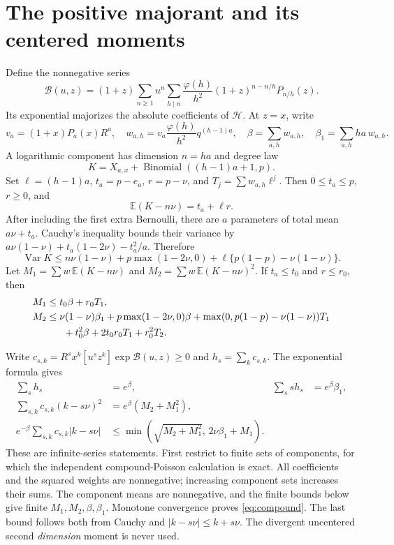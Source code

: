 \documentclass[11pt]{article}
\theoremstyle{remark}\newtheorem{remark}[theorem]{Remark}
\newcommand{\E}{\mathbb E}
\newcommand{\Var}{\operatorname{Var}}
\newcommand{\Hcal}{\mathcal H}
\newcommand{\Bcal}{\mathcal B}
\begin{document}
\section{The positive majorant and its centered moments}\label{sec:majorant}
Define the nonnegative series
\[
 \Bcal(u,z)=(1+z)\sum_{n\ge1}u^n
  \sum_{h\mid n}\frac{\varphi(h)}{h^2}(1+z)^{n-n/h}P_{n/h}(z).
\]
Its exponential majorizes the absolute coefficients of $\Hcal$.
At $z=x$, write
\[
 v_a=(1+x)P_a(x)R^a,\quad
 w_{a,h}=v_a\frac{\varphi(h)}{h^2}q^{(h-1)a},\quad
 \beta=\sum_{a,h}w_{a,h},\quad \beta_1=\sum_{a,h}ha\,w_{a,h}.
\]
A logarithmic component has dimension $n=ha$ and degree law
\begin{equation}\label{eq:componentlaw}
 K=X_{a,x}+\operatorname{Binomial}((h-1)a+1,p).
\end{equation}
Set $\ell=(h-1)a$, $t_a=p-e_a$, $r=p-\nu$, and $T_j=\sum w_{a,h}\ell^j$.
Then $0\le t_a\le p$, $r\ge0$, and
\[
 \E(K-n\nu)=t_a+\ell r.
\]
After including the first extra Bernoulli, there are $a$ parameters of total
mean $a\nu+t_a$. Cauchy's inequality bounds their variance by
$a\nu(1-\nu)+t_a(1-2\nu)-t_a^2/a$. Therefore
\begin{equation}\label{eq:jensen}
 \Var K\le n\nu(1-\nu)+p\max(1-2\nu,0)
                      +\ell\{p(1-p)-\nu(1-\nu)\}.
\end{equation}
Let $M_1=\sum w\,\E(K-n\nu)$ and
$M_2=\sum w\,\E(K-n\nu)^2$. If $t_a\le t_0$ and $r\le r_0$, then
\begin{align}
 M_1&\le t_0\beta+r_0T_1,\label{eq:M1}\\
 M_2&\le \nu(1-\nu)\beta_1+p\max(1-2\nu,0)\beta
 +\max(0,p(1-p)-\nu(1-\nu))T_1\notag\\
 &\hspace{6mm}+t_0^2\beta+2t_0r_0T_1+r_0^2T_2.\label{eq:M2}
\end{align}

Write $c_{s,k}=R^sx^k[u^sz^k]\exp\Bcal(u,z)\ge0$ and $h_s=\sum_kc_{s,k}$.
The exponential formula gives
\begin{align}
 \sum_s h_s&=e^\beta,& \sum_s s h_s&=e^\beta\beta_1,\\
 \sum_{s,k}c_{s,k}(k-s\nu)^2&=e^\beta(M_2+M_1^2),\label{eq:compound}\\
 e^{-\beta}\sum_{s,k}c_{s,k}|k-s\nu|
 &\le \min\left(\sqrt{M_2+M_1^2},\,2\nu\beta_1+M_1\right).\label{eq:absolute}
\end{align}
These are infinite-series statements. First restrict to finite sets of
components, for which the independent compound-Poisson calculation is exact.
All coefficients and the squared weights are nonnegative; increasing component
sets increases their sums. The component means are nonnegative, and the
finite bounds below give finite $M_1,M_2,\beta,\beta_1$. Monotone convergence
proves \eqref{eq:compound}. The last bound follows both from Cauchy and
$|k-s\nu|\le k+s\nu$.
The divergent uncentered second \emph{dimension} moment is never used.
\end{document}
